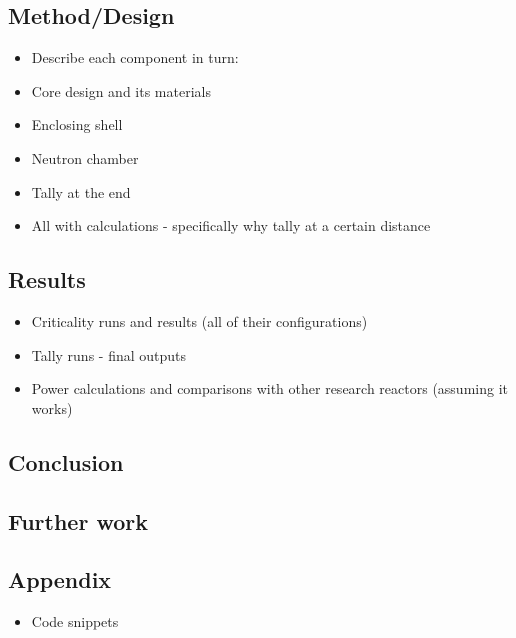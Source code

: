 \documentclass[12pt,a4paper]{article}
\begin{document}
\subsection{Method/Design}
\begin{itemize}
	\item Describe each component in turn:
	\item Core design and its materials
	\item Enclosing shell
	\item Neutron chamber
	\item Tally at the end
	\item All with calculations - specifically why tally at a certain distance
\end{itemize}
\subsection{Results}
\begin{itemize}
	\item Criticality runs and results (all of their configurations)
	\item Tally runs - final outputs
	\item Power calculations and comparisons with other research reactors (assuming it works)
\end{itemize}
\subsection{Conclusion}
\subsection{Further work}
\subsection{Appendix}
\begin{itemize}
	\item Code snippets
\end{itemize}
\end{document}
